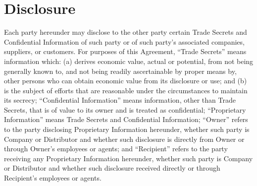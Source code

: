 \documentclass[letterpaper,10pt,english]{sphinxmanual}
\begin{document}
\section{Disclosure}
\label{\detokenize{nondisclosure:disclosure}}
Each party hereunder may disclose to the other party certain Trade Secrets and Confidential Information of such party or of such party’s associated companies, suppliers, or customers. For purposes of this Agreement, “Trade Secrets” means information which: (a) derives economic value, actual or potential, from not being generally known to, and not being readily ascertainable by proper means by, other persons who can obtain economic value from its disclosure or use; and (b) is the subject of efforts that are reasonable under the circumstances to maintain its secrecy; “Confidential Information” means information, other than Trade Secrets, that is of value to its owner and is treated as confidential; “Proprietary Information” means Trade Secrets and Confidential Information; “Owner” refers to the party disclosing Proprietary Information hereunder, whether such party is Company or Distributor and whether such disclosure is directly from Owner or through Owner’s employees or agents; and “Recipient” refers to the party receiving any Proprietary Information hereunder, whether such party is Company or Distributor and whether such disclosure received directly or through Recipient’s employees or agents.
\end{document}
